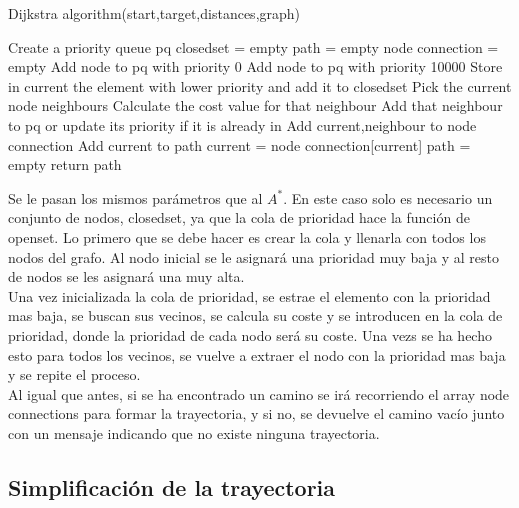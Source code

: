 \begin{algorithm}
\caption{Dijkstra algorithm(start,target,distances,graph)}\label{dikjstra}
\begin{algorithmic}
\State Create a priority queue pq
\State closedset = empty
\State path = empty
\State node connection = empty
 		\State Add node to pq with priority 0
 	\Else
 		\State Add node to pq with priority 10000
 	\EndIf
\EndFor
{}
	\State Store in current the element with lower priority and add it to closedset
 		\State Pick the current node neighbours
 			\State Calculate the cost value for that neighbour
 			\State Add that neighbour to pq or update its priority if it is already in
 			\State Add current,neighbour to node connection
		\EndIf
	\EndFor
\EndWhile
{}
		\State Add current to path
		\State current = node connection[current]
	\EndWhile
\Else
	\State path = empty
\EndIf
\State return path
\end{algorithmic}
\end{algorithm}

Se le pasan los mismos parámetros que al $A^*$. En este caso solo es necesario un conjunto de nodos, closedset, ya que la cola de prioridad hace la función de openset. Lo primero que se debe hacer es crear la cola y llenarla con todos los nodos del grafo. Al nodo inicial se le asignará una prioridad muy baja y al resto de nodos se les asignará una muy alta.\\

Una vez inicializada la cola de prioridad, se estrae el elemento con la prioridad mas baja, se buscan sus vecinos, se calcula su coste y se introducen en la cola de prioridad, donde la prioridad de cada nodo será su coste. Una vezs se ha hecho esto para todos los vecinos, se vuelve a extraer el nodo con la prioridad mas baja y se repite el proceso.\\

Al igual que antes, si se ha encontrado un camino se irá recorriendo el array node connections para formar la trayectoria, y si no, se devuelve el camino vacío junto con un mensaje indicando que no existe ninguna trayectoria.

\subsection{Simplificación de la trayectoria}

